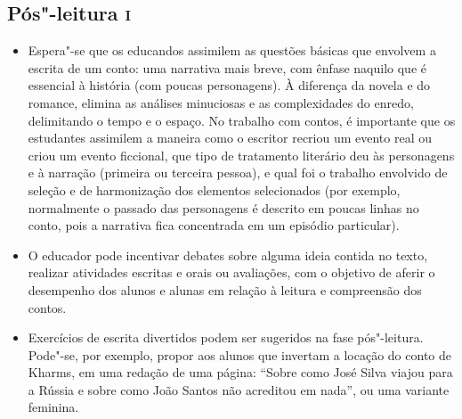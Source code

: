 \documentclass[11pt]{extarticle}
\begin{document}
\pagebreak

\subsection{Pós"-leitura \textsc{i}}


\begin{itemize}
\item Espera"-se que os educandos assimilem as questões básicas que envolvem
a escrita de um conto: uma narrativa mais breve, com ênfase naquilo que
é essencial à história (com poucas personagens). À diferença da novela e
do romance, elimina as análises minuciosas e as complexidades do enredo,
delimitando o tempo e o espaço. No trabalho com contos, é importante que
os estudantes assimilem a maneira como o escritor recriou um evento real
ou criou um evento ficcional, que tipo de tratamento literário deu às
personagens e à narração (primeira ou terceira pessoa), e qual foi o
trabalho envolvido de seleção e de harmonização dos elementos
selecionados (por exemplo, normalmente o passado das personagens é
descrito em poucas linhas no conto, pois a narrativa fica concentrada em
um episódio particular).

\item O educador pode incentivar debates sobre alguma ideia contida no
texto, realizar atividades escritas e orais ou avaliações, com o
objetivo de aferir o desempenho dos alunos e alunas em relação à leitura
e compreensão dos contos.

\item Exercícios de escrita divertidos podem ser sugeridos na fase
pós"-leitura. Pode"-se, por exemplo, propor aos alunos que invertam a
locação do conto de Kharms, em uma redação de uma página: ``Sobre como
José Silva viajou para a Rússia e sobre como João Santos não acreditou
em nada'', ou uma variante feminina.


\end{itemize}
\end{document}
